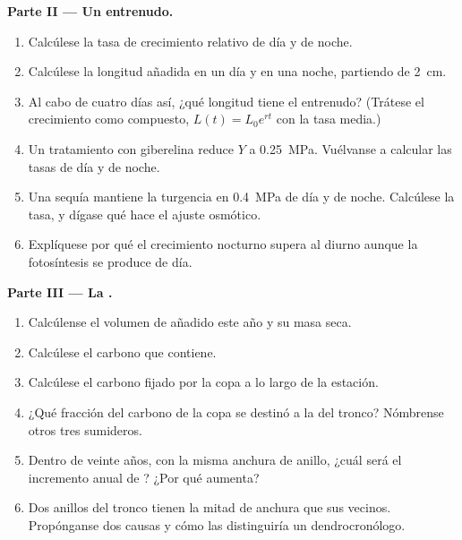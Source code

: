 \begin{problem}
\medskip
\noindent\textbf{Parte II --- Un entrenudo.}
\begin{enumerate}[resume]
  \item Calcúlese la tasa de crecimiento relativo de día y de noche.
  \item Calcúlese la longitud añadida en un día y en una noche, partiendo de
        \qty{2}{cm}.
  \item Al cabo de cuatro días así, ¿qué longitud tiene el entrenudo?
        (Trátese el crecimiento como compuesto, $L(t) = L_0 e^{rt}$ con la
        tasa media.)
  \item Un tratamiento con giberelina reduce $Y$ a \qty{0.25}{MPa}.
        Vuélvanse a calcular las tasas de día y de noche.
  \item Una sequía mantiene la turgencia en \qty{0.4}{MPa} de día y de
        noche. Calcúlese la tasa, y dígase qué hace el ajuste osmótico.
  \item Explíquese por qué el crecimiento nocturno supera al diurno aunque
        la fotosíntesis se produce de día.
\end{enumerate}

\medskip
\noindent\textbf{Parte III --- La .}
\begin{enumerate}[resume]
  \item Calcúlense el volumen de  añadido este año y su masa seca.
  \item Calcúlese el carbono que contiene.
  \item Calcúlese el carbono fijado por la copa a lo largo de la estación.
  \item ¿Qué fracción del carbono de la copa se destinó a la  del
        tronco? Nómbrense otros tres sumideros.
  \item Dentro de veinte años, con la misma anchura de anillo, ¿cuál será
        el incremento anual de ? ¿Por qué aumenta?
  \item Dos anillos del tronco tienen la mitad de anchura que sus vecinos.
        Propónganse dos causas y cómo las distinguiría un
        dendrocronólogo.
\end{enumerate}


\end{problem}
